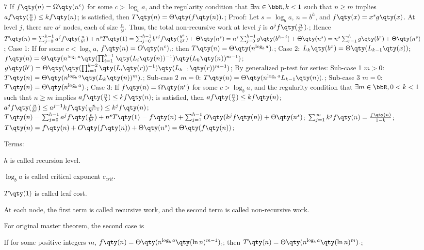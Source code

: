 \documentclass[a4paper,10pt]{extarticle}
\begin{document}
\begin{multicols}{7}
If $f\qty(n)=\Omega\qty(n^c)$ for some $c>\log_ba$, and the regularity condition that $\exists m\in\bbR,k<1$ such that $n\ge m$ implies
\(af\qty(\frac{n}{b})\le kf\qty(n)\); 
is satisfied, then
\(T\qty(n)=\Theta\qty(f\qty(n)).\); 
Proof:
Let $s=\log_ba$, $n=b^h$, and $f\qty(x)=x^sg\qty(x)$. At level $j$, there are $a^j$ nodes, each of size $\frac{n}{b^j}$. Thus, the total non-recursive work at level $j$ is
\(a^jf\qty(\frac{n}{b^j}).\); 
Hence
\(
T\qty(n)=\sum_{j=0}^{h-1}a^jf\qty(\frac{n}{b^j})+n^sT\qty(1)
=\sum_{j=0}^{h-1}b^{sj}f\qty(\frac{b^h}{b^j})+\Theta\qty(n^s)
=n^s\sum_{j=0}^{h-1}g\qty(b^{h-j})+\Theta\qty(n^s)
=n^s\sum_{r=1}^hg\qty(b^r)+\Theta\qty(n^s)
\); 
Case 1: If for some $c<\log_ba$,
\(f\qty(n)=O\qty(n^c),\); 
then
\(T\qty(n)=\Theta\qty(n^{\log_ba}).\); 
Case 2:
\(L_{k}\qty(b^x)=\Theta\qty(L_{k-1}\qty(x))\); 
\(f\qty(n)=\Theta\qty(n^{\log_ba}\qty(\prod_{i=1}^{k-1}\qty(L_{i}\qty(n))^{-1})\qty(L_{k}\qty(n))^{m-1})\); 
\(g\qty(b^r)=\Theta\qty(\qty(\prod_{i=1}^{k-2}\qty(L_{i}\qty(r))^{-1})\qty(L_{k-1}\qty(r))^{m-1})\); 
By generalized p-test for series: Sub-case 1 $m>0$:
\(T\qty(n)=\Theta\qty(n^{\log_ba}\qty(L_{k}\qty(n))^m).\); 
Sub-case 2 $m=0$:
\(T\qty(n)=\Theta\qty(n^{\log_ba}L_{k-1}\qty(n)).\); 
Sub-case 3 $m=0$:
\(T\qty(n)=\Theta\qty(n^{\log_ba}).\); 
Case 3: If $f\qty(n)=\Omega\qty(n^c)$ for some $c>\log_ba$, and the regularity condition that $\exists m\in\bbR,0<k<1$ such that $n\ge m$ implies
\(af\qty(\frac{n}{b})\le kf\qty(n)\); 
is satisfied, then
\(af\qty(\frac{n}{b})\le kf\qty(n)\); 
\(a^jf\qty(\frac{n}{b^j})\le a^{j-1}kf\qty(\frac{n}{b^{j-1}})\le k^jf\qty(n)\); 
\(
T\qty(n)=\sum_{j=0}^{h-1}a^jf\qty(\frac{n}{b^j})+n^sT\qty(1)
=f\qty(n)+\sum_{j=1}^{h-1}O\qty(k^jf\qty(n))+\Theta\qty(n^s)
\); 
\(\sum_{j=1}^{\infty}k^jf\qty(n)=\frac{f\qty(n)}{1-k}\); 
\(T\qty(n)=f\qty(n)+O\qty(f\qty(n))+\Theta\qty(n^s)=\Theta\qty(f\qty(n))\); 

Terms:

$h$ is called recursion level.

$\log_ba$ is called critical exponent $c_{crit}$.

$T\qty(1)$ is called leaf cost.

At each node, the first term is called recursive work, and the second term is called non-recursive work.

For original master theorem, the second case is

If for some positive integers $m$, 
\(f\qty(n)=\Theta\qty(n^{\log_ba}\qty(\ln n)^{m-1}),\); 
then
\(T\qty(n)=\Theta\qty(n^{\log_ba}\qty(\ln n)^m).\); 


\end{multicols}
\end{document}

